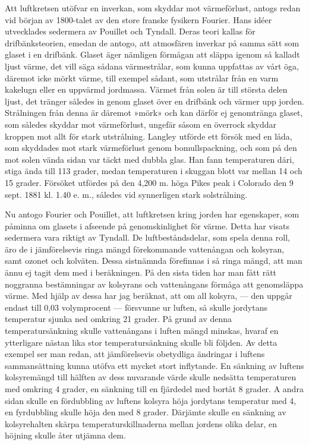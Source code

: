 \documentclass[a4paper, 12pt, oneside, swedish]{article}
\begin{document}
Att luftkretsen utöfvar en inverkan, som skyddar mot värmeförlust, antogs redan vid början av 1800-talet av den store franske fysikern Fourier. Hans idéer utvecklades sedermera av Pouillet och Tyndall. Deras teori kallas för drifbänksteorien, emedan de antogo, att atmosfären inverkar på samma sätt som glaset i en drifbänk. Glaset äger nämligen förmågan att släppa igenom så kalladt ljust värme, det vill säga sådana värmestrålar, som kunna uppfattas av vårt öga, däremot icke mörkt värme, till exempel sådant, som utstrålar från en varm kakelugn eller en uppvärmd jordmassa. Värmet från solen är till största delen ljust, det tränger således in genom glaset över en drifbänk och värmer upp jorden. Strålningen från denna är däremot »mörk» och kan därför ej genomtränga glaset, som således skyddar mot värmeförlust, ungefär såsom en överrock skyddar kroppen mot allt för stark utstrålning. Langley utförde ett försök med en låda, som skyddades mot stark värmeförlust genom bomullspackning, och som på den mot solen vända sidan var täckt med dubbla glas. Han fann temperaturen däri, stiga ända till 113 grader, medan temperaturen i skuggan blott var mellan 14 och 15 grader. Försöket utfördes på den 4,200 m. höga Pikes peak i Colorado den 9 sept. 1881 kl. 1.40 e. m., således vid synnerligen stark solstrålning.

Nu antogo Fourier och Pouillet, att luftkretsen kring jorden har egenskaper, som påminna om glasets i afseende på genomskinlighet för värme. Detta har visats sedermera vara riktigt av Tyndall. De luftbeståndsdelar, som spela denna roll, äro de i jämförelsevis ringa mängd förekommande vattenångan och kolsyran, samt ozonet och kolväten. Dessa sistnämnda förefinnas i så ringa mängd, att man ännu ej tagit dem med i beräkningen. På den sista tiden har man fått rätt noggranna bestämningar av kolsyrans och vattenångans förmåga att genomsläppa värme. Med hjälp av dessa har jag beräknat, att om all kolsyra, --- den uppgår endast till 0,03 volymprocent --- försvunne ur luften, så skulle jordytans temperatur sjunka ned omkring 21 grader. På grund av denna temperatursänkning skulle vattenångans i luften mängd minskas, hvaraf en ytterligare nästan lika stor temperatursänkning skulle bli följden. Av detta exempel ser man redan, att jämförelsevis obetydliga ändringar i luftens sammansättning kunna utöfva ett mycket stort inflytande. En sänkning av luftens kolsyremängd till hälften av dess nuvarande värde skulle nedsätta temperaturen med omkring 4 grader, en sänkning till en fjärdedel med bortåt 8 grader. A andra sidan skulle en fördubbling av luftens kolsyra höja jordytans temperatur med 4, en fyrdubbling skulle höja den med 8 grader. Därjämte skulle en sänkning av kolsyrehalten skärpa temperaturskillnaderna mellan jordens olika delar, en höjning skulle åter utjämna dem.
\end{document}
